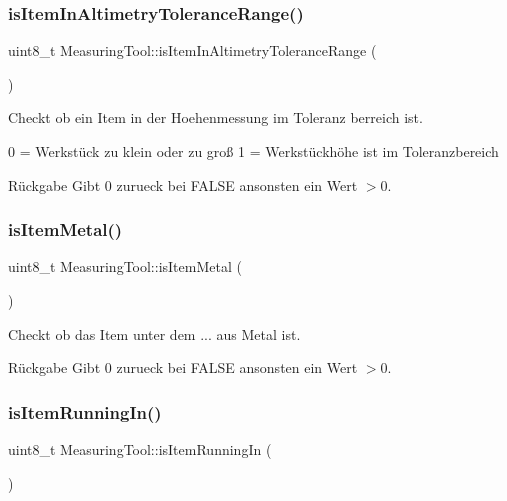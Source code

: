 \subsubsection{\texorpdfstring{is\+Item\+In\+Altimetry\+Tolerance\+Range()}{isItemInAltimetryToleranceRange()}}
{\footnotesize\ttfamily uint8\+\_\+t Measuring\+Tool\+::is\+Item\+In\+Altimetry\+Tolerance\+Range (\begin{DoxyParamCaption}{ }\end{DoxyParamCaption})}

Checkt ob ein Item in der Hoehenmessung im Toleranz berreich ist.

0 = Werkstück zu klein oder zu groß 1 = Werkstückhöhe ist im Toleranzbereich

\begin{DoxyReturn}{Rückgabe}
Gibt 0 zurueck bei F\+A\+L\+SE ansonsten ein Wert $>$0. 
\end{DoxyReturn}
\hypertarget{class_measuring_tool_a1d98ab82733fbdee6e63f880a8ace322}{}\label{class_measuring_tool_a1d98ab82733fbdee6e63f880a8ace322} 
\subsubsection{\texorpdfstring{is\+Item\+Metal()}{isItemMetal()}}
{\footnotesize\ttfamily uint8\+\_\+t Measuring\+Tool\+::is\+Item\+Metal (\begin{DoxyParamCaption}{ }\end{DoxyParamCaption})}

Checkt ob das Item unter dem ... aus Metal ist.

\begin{DoxyReturn}{Rückgabe}
Gibt 0 zurueck bei F\+A\+L\+SE ansonsten ein Wert $>$0. 
\end{DoxyReturn}
\hypertarget{class_measuring_tool_a1749a84c95ae88ef6e8e65edfa2204bc}{}\label{class_measuring_tool_a1749a84c95ae88ef6e8e65edfa2204bc} 
\subsubsection{\texorpdfstring{is\+Item\+Running\+In()}{isItemRunningIn()}}
{\footnotesize\ttfamily uint8\+\_\+t Measuring\+Tool\+::is\+Item\+Running\+In (\begin{DoxyParamCaption}{ }\end{DoxyParamCaption})}

